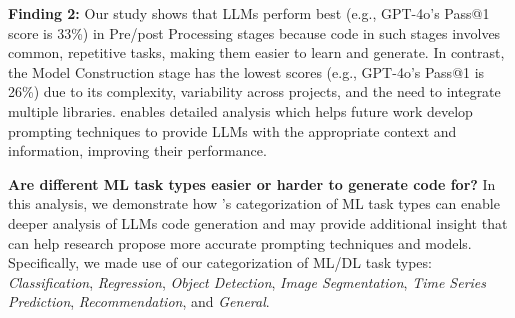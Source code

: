 %


\begin{tcolorbox}[boxrule=0.5pt, colback=gray!10, arc=4pt,left=3pt,right=3pt,top=3pt,bottom=3pt,boxsep=0pt
]
\textbf{Finding 2:} Our study shows that LLMs perform best (e.g., GPT-4o's Pass@1 score is 33\%) in Pre/post Processing stages because code in such stages involves common, repetitive tasks, making them easier to learn and generate. In contrast, the Model Construction stage has the lowest scores (e.g., GPT-4o's Pass@1 is 26\%) due to its complexity, variability across projects, and the need to integrate multiple libraries. 
\tool enables detailed analysis which helps future work develop prompting techniques to provide LLMs with the appropriate context and information, improving their performance.
\end{tcolorbox}




\textbf{Are different ML task types easier or harder to generate code for?}
In this analysis, we demonstrate how \tool's categorization of ML task types can enable deeper analysis of LLMs code generation and may provide additional insight that can help research propose more accurate prompting techniques and models. Specifically, we made use of our categorization of ML/DL task types: \textit{Classification}, \textit{Regression}, \textit{Object Detection}, \textit{Image Segmentation}, \textit{Time Series Prediction}, \textit{Recommendation}, and \textit{General}.

